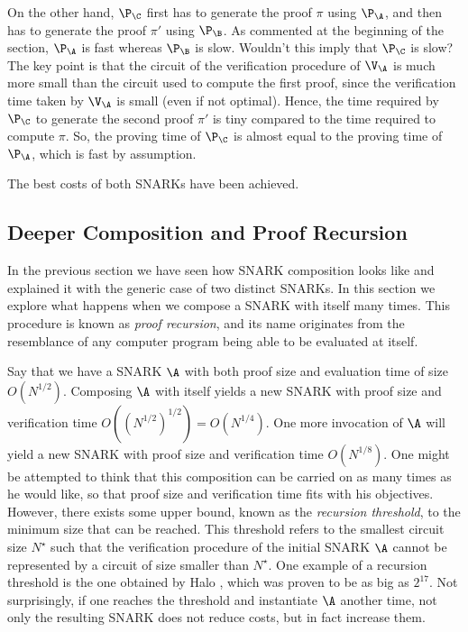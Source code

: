On the other hand, $\P_{\C}$ first has to generate the proof $\pi$ using $\P_{\A}$, and then has to generate the proof $\pi'$ using $\P_{\B}$. As commented at the beginning of the section, $\P_{\A}$ is fast whereas $\P_{\B}$ is slow. Wouldn't this imply that $\P_{\C}$ is slow? The key point is that the circuit of the verification procedure of $\V_{\A}$ is much more small than the circuit used to compute the first proof, since the verification time taken by $\V_{\A}$ is small (even if not optimal). Hence, the time required by $\P_{\C}$ to generate the second proof $\pi'$ is tiny compared to the time required to compute $\pi$. So, the proving time of $\P_{\C}$ is almost equal to the proving time of $\P_{\A}$, which is fast by assumption.

The best costs of both SNARKs have been achieved.




\subsection{Deeper Composition and Proof Recursion}

In the previous section we have seen how SNARK composition looks like and explained it with the generic case of two distinct SNARKs. In this section we explore what happens when we compose a SNARK with itself many times. This procedure is known as \textit{proof recursion}, and its name originates from the resemblance of any computer program being able to be evaluated at itself.

Say that we have a SNARK $\A$ with both proof size and evaluation time of size $O\left(N^{1/2}\right)$. Composing $\A$ with itself yields a new SNARK with proof size and verification time $O\left(\left(N^{1/2}\right)^{1/2}\right) = O\left(N^{1/4}\right)$. One more invocation of $\A$ will yield a new SNARK with proof size and verification time $O\left(N^{1/8}\right)$. One might be attempted to think that this composition can be carried on as many times as he would like, so that proof size and verification time fits with his objectives. However, there exists some upper bound, known as the \textit{recursion threshold}, to the minimum size that can be reached. This threshold refers to the smallest circuit size $N^{\star}$ such that the verification procedure of the initial SNARK $\A$ cannot be represented by a circuit of size smaller than $N^{\star}$. One example of a recursion threshold is the one obtained by Halo \cite{EPRINT:BowGriHop19}, which was proven to be as big as $2^{17}$. Not surprisingly, if one reaches the threshold and instantiate $\A$ another time, not only the resulting SNARK does not reduce costs, but in fact increase them.

